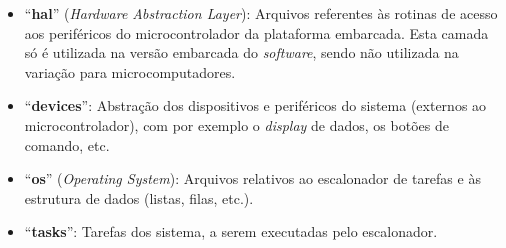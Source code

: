 \begin{itemize}
    \item ``\textbf{hal}'' (\textit{Hardware Abstraction Layer}): Arquivos referentes às rotinas de acesso aos periféricos do microcontrolador da plataforma embarcada. Esta camada só é utilizada na versão embarcada do \textit{software}, sendo não utilizada na variação para microcomputadores.
    \item ``\textbf{devices}'': Abstração dos dispositivos e periféricos do sistema (externos ao microcontrolador), com por exemplo o \textit{display} de dados, os botões de comando, etc.
    \item ``\textbf{os}'' (\textit{Operating System}): Arquivos relativos ao escalonador de tarefas e às estrutura de dados (listas, filas, etc.).
    \item ``\textbf{tasks}'': Tarefas dos sistema, a serem executadas pelo escalonador.
\end{itemize}
